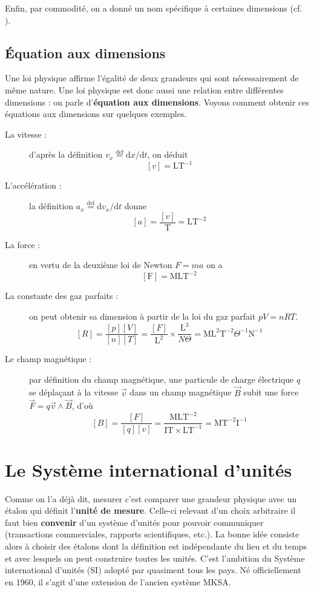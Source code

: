 Enfin, par commodité, on a donné un nom spécifique à  certaines dimensions (cf. ).



\subsection{Équation aux dimensions}	
Une loi physique affirme l'égalité de deux grandeurs qui sont nécessairement de même nature. Une loi physique est donc aussi une relation entre différentes dimensions : on parle d'\textbf{équation aux dimensions}. 
Voyons comment obtenir ces équations aux dimensions sur quelques exemples. 
\begin{description}
	\item[La vitesse :] d'après la définition $v_x\stackrel{\text{def}}=\mathrm{d}x/\mathrm{d}t$, on déduit 
	\[[v]=\mathrm{LT^{-1}}\]
	\item[L'accélération :] la définition $a_x\stackrel{\text{def}}=\mathrm{d}v_x/\mathrm{d}t$ donne 
	\[[a]=\frac{[v]}{\text{T}}=\mathrm{LT^{-2}}\]
	\item[La force :] en vertu de la deuxième loi de Newton $F=ma$ on a 
	\[[\text{F}]=\mathrm{MLT^{-2}}\] 
	\item[La constante des gaz parfaits :] on peut obtenir sa dimension à partir de la loi du gaz parfait $pV=nRT$.  
	\[ [R]=\frac{[p][V]}{[n][T]}=\frac{[F]}{\mathrm{L^{2}}}\times\frac{\mathrm{L^3}}{N\Theta}=
	\mathrm{ML^2}\mathrm{T^{-2}}\Theta^{-1}\mathrm{N^{-1}}\]	
	\item[Le champ magnétique :] par définition du champ magnétique, une particule de charge électrique 
	$q$ se déplaçant à la vitesse $\overrightarrow{v}$ dans un champ magnétique $\overrightarrow{B}$ subit une force 
	$\overrightarrow{F}=q\overrightarrow{v}\wedge\overrightarrow{B}$, d'où
	\[ [B]=\frac{[F]}{[q][v]}=\frac{\mathrm{MLT}^{-2}}{\mathrm{IT}\times \mathrm{LT}^{-1}}=\mathrm{MT}^{-2}\mathrm{I}^{-1}\]
\end{description}



\section[Le SI]{Le Système international d'unités}
Comme on l'a déjà dit, mesurer c'est comparer une grandeur physique avec un étalon qui définit l'\textbf{unité de mesure}. Celle-ci relevant d'un choix arbitraire il faut bien  \textbf{convenir} d'un système d'unités pour pouvoir communiquer (transactions commerciales, rapports scientifiques, etc.). La bonne idée consiste alors à choisir des étalons dont la définition est indépendante du lieu et du temps et avec lesquels on peut construire toutes les unités. C'est l'ambition du Système international d'unités (SI) adopté par quasiment tous les pays. Né officiellement en 1960, il s'agit d'une extension de l'ancien système MKSA. 


